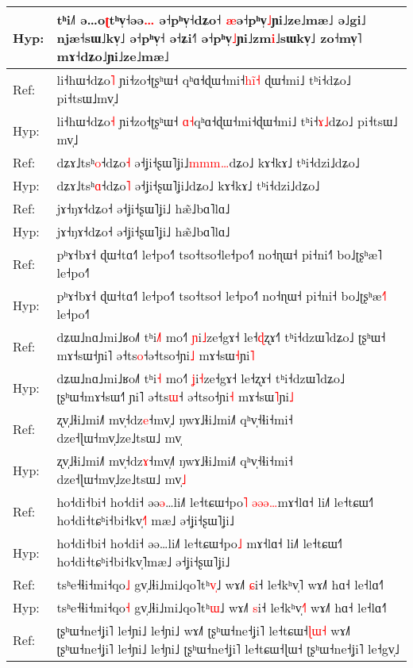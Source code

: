 \documentclass[10pt]{article}
\DeclareRobustCommand{\hl}[1]{{\textcolor{red}{#1}}}
\begin{document}
\begin{longtable}{ll}
Hyp: & tʰi˩˥\hl{ }ə…o\hl{ʈ}tʰv̩˧əə\hl{…}\hl{ }ə˧pʰv̩˧dʑo˧ \hl{æ}ə˧pʰv̩\hl{˩}ɲi˩ze˩mæ˩ ə˩gi˩ njæ˧sɯ˩kv̩˩ ə˧pʰv̩˧ ə˧ʑi˧˥ ə˧pʰv̩\hl{˩}ɲi˩zm\hl{i}˩sɯkv̩˩ zo˧mv̩˥ mɤ˧dʑo˩ɲi˩ze˩mæ˩ \\ 
\midrule 
Ref: & li˧hɯ˧dʑo\hl{˥} ɲi˧zo˧ʈʂʰɯ˧ qʰɑ˧ɖɯ˧mi˧\hl{h}\hl{i}\hl{̃}\hl{˧}\hl{ }ɖɯ˧mi˩ tʰi˧dʑo˩ pi˧tsɯ˩mv̩˩ \\ 
Hyp: & li˧hɯ˧dʑo\hl{˧} ɲi˧zo˧ʈʂʰɯ˧ \hl{ɑ}\hl{˧}qʰɑ˧ɖɯ˧mi˧ɖɯ˧mi˩ tʰi˧\hl{ɤ}\hl{˩}dʑo˩ pi˧tsɯ˩\hl{ }mv̩˩ \\ 
\midrule 
Ref: & dʑɤ˩tsʰ\hl{o}˧dʑo\hl{˧} ə˧ʝi˧ʂɯ˥ʝi˩\hl{m}\hl{m}\hl{m}\hl{…}dʑo˩ kɤ˧kɤ˩ tʰi˧dzi˩dʑo˩\hl{ } \\ 
Hyp: & dʑɤ˩tsʰ\hl{ɑ}˧dʑo\hl{˥} ə˧ʝi˧ʂɯ˥ʝi˩dʑo˩ kɤ˧kɤ˩ tʰi˧dzi˩dʑo˩ \\ 
\midrule 
Ref: & jɤ˧ŋɤ˧dʑo˧ ə˧ʝi˧ʂɯ˥ʝi˩ hæ̃˩bɑ˥lɑ˩ \\ 
Hyp: & jɤ˧ŋɤ˧dʑo˧ ə˧ʝi˧ʂɯ˥ʝi˩ hæ̃˩bɑ˥lɑ˩ \\ 
\midrule 
Ref: & pʰɤ˧bɤ˧ ɖɯ˧tɑ˧˥ le˧po˧˥ tso˧tso˧le˧po˧˥ no˧ɳɯ˧ pi˧ni˧\hl{˥} bo˩ʈʂʰæ˥ le˧po˧˥ \\ 
Hyp: & pʰɤ˧bɤ˧ ɖɯ˧tɑ˧˥ le˧po˧˥ tso˧tso˧\hl{ }le˧po˧˥ no˧ɳɯ˧ pi˧ni˧ bo˩ʈʂʰæ\hl{˧}˥ le˧po˧˥ \\ 
\midrule 
Ref: & dʑɯ˩nɑ˩mi˩ʁo˩˥ tʰi\hl{˩}\hl{˥} mo˧˥ \hl{ɲ}i\hl{˩}ze˧gɤ˧ le˧\hl{ɖ}ʐɤ˧\hl{˥} tʰi˧dzɯ˥dʑo˩ ʈʂʰɯ˧\hl{ }mɤ˧sɯ˧ɲi˥ ə˧ts\hl{o}˧ə˧tso˧ɲi\hl{˩} mɤ˧sɯ\hl{˧}ɲi\hl{˥} \\ 
Hyp: & dʑɯ˩nɑ˩mi˩ʁo˩˥ tʰi\hl{˧} mo˧˥ \hl{ʝ}i\hl{˧}ze˧gɤ˧ le˧ʐɤ˧ tʰi˧dzɯ˥dʑo˩ ʈʂʰɯ˧mɤ˧sɯ˧\hl{˥}\hl{ }ɲi˥ ə˧ts\hl{ɯ}˧\hl{ }ə˧tso˧ɲi\hl{˧} mɤ˧sɯ\hl{˥}ɲi\hl{˩} \\ 
\midrule 
Ref: & ʐv̩˩ɬi˩mi˩˥ mv̩˧dz\hl{e}˧mv̩˩ ŋwɤ˩ɬi˩mi˩˥ qʰv̩˧ɬi˧mi˧ dze˧ɭɯ˧mv̩˩ze˩tsɯ˩ mv̩ \\ 
Hyp: & ʐv̩˩ɬi˩mi˩˥ mv̩˧dz\hl{ɤ}˧mv̩˩\hl{˥} ŋwɤ˩ɬi˩mi˩˥ qʰv̩˧ɬi˧mi˧ dze˧ɭɯ˧mv̩˩ze˩tsɯ˩ mv̩\hl{˩} \\ 
\midrule 
Ref: & ho˧di˧bi˧ ho˧di˧ əə\hl{ə}…li˩˥ le˧tɕɯ˧po\hl{˥} \hl{ə}\hl{ə}\hl{ə}\hl{…}mɤ˧lɑ˧ li˩˥ le˧tɕɯ˧˥ ho˧di˧tɕʰi˧bi˧kv̩\hl{˧}˥\hl{ }mæ˩ ə˧ʝi˧ʂɯ˥ʝi˩ \\ 
Hyp: & ho˧di˧bi˧ ho˧di˧ əə…li˩˥ le˧tɕɯ˧po\hl{˩} mɤ˧lɑ˧ li˩˥ le˧tɕɯ˧˥ ho˧di˧tɕʰi˧bi˧kv̩˥mæ˩ ə˧ʝi˧ʂɯ˥ʝi˩ \\ 
\midrule 
Ref: & tsʰe˧ɬi˧mi˧qo\hl{˩} gv̩˩ɬi˩mi˩qo˥tʰ\hl{v}\hl{̩}˩ wɤ˩˥ \hl{ɕ}i˧ le˧kʰv̩˥ wɤ˩˥ hɑ˧ le˧lɑ˧˥ \\ 
Hyp: & tsʰe˧ɬi˧mi˧qo\hl{˧} gv̩˩ɬi˩mi˩qo˥tʰ\hl{ɯ}˩ wɤ˩˥ \hl{s}i˧ le˧kʰv̩\hl{˧}˥ wɤ˩˥ hɑ˧ le˧lɑ˧˥ \\ 
\midrule 
Ref: & ʈʂʰɯ˧ne˧ʝi˥ le˧ɲi˩ le˧ɲi˩ wɤ˩˥ ʈʂʰɯ˧ne˧ʝi˥ le˧tɕɯ˧\hl{ɭ}\hl{ɯ}\hl{˧} wɤ˩˥ ʈʂʰɯ˧ne˧ʝi˥ le˧ɲi˩ le˧ɲi˩ ʈʂʰɯ˧ne˧ʝi˥ le˧tɕɯ˧ɭɯ˧ ʈʂʰɯ˧ne˧ʝi˥ le˧gv̩˩ \\ 

\end{longtable}
\end{document}

